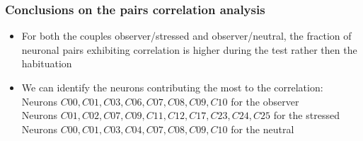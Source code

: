 \documentclass{beamer}
\begin{document}
\begin{frame}
\frametitle{Conclusions on the pairs correlation analysis}



\begin{itemize}
	
	\item For both the couples observer/stressed and observer/neutral, the fraction of neuronal pairs exhibiting correlation is higher during the test rather then the habituation 
	
	\item We can identify the neurons contributing the most to the correlation:\\
	Neurons $C00, C01, C03, C06, C07, C08, C09, C10$ for the observer \\
	Neurons $ C01, C02,  C07, C09, C11, C12, C17, C23, C24, C25$ for the stressed \\
	Neurons $C00, C01, C03, C04, C07, C08, C09, C10$ for the neutral 

	
	
	
\end{itemize}

\end{frame}	
\end{document}
